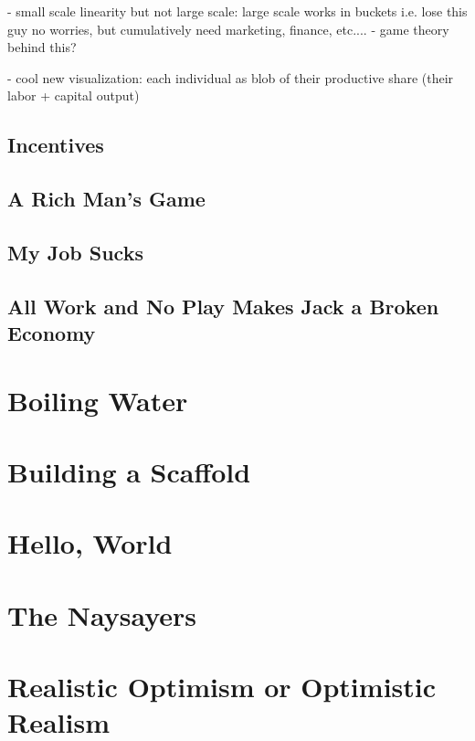 \documentclass[12pt]{memoir}
\begin{document}
			- small scale linearity but not large scale: large scale works in buckets i.e. lose this guy no worries, but cumulatively need marketing, finance, etc....
			- game theory behind this?
			
			- cool new visualization: each individual as blob of their productive share (their labor + capital output)
		
		\section{Incentives}
		
		 \section{A Rich Man's Game}
		 
		\section{My Job Sucks}
		
		\section{All Work and No Play Makes Jack a Broken Economy}
		
	\chapter{Boiling Water}
	
	\chapter{Building a Scaffold}
	
	\chapter{Hello, World}
	
	\chapter{The Naysayers}
	
	\chapter{Realistic Optimism or Optimistic Realism}
	
	
	
	
\end{document}
